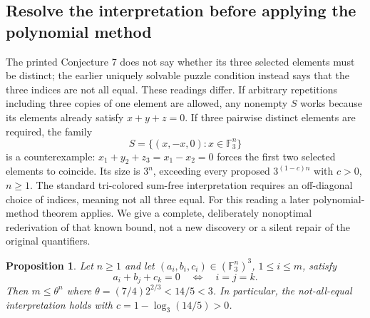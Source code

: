 \documentclass[11pt]{article}
\newtheorem{proposition}{Proposition}
\begin{document}
\subsection{Resolve the interpretation before applying the polynomial method}
The printed Conjecture 7 does not say whether its three selected elements must be distinct; the earlier uniquely solvable puzzle condition instead says that the three indices are not all equal. These readings differ. If arbitrary repetitions including three copies of one element are allowed, any nonempty $S$ works because its elements already satisfy $x+y+z=0$. If three pairwise distinct elements are required, the family
\[
S=\{(x,-x,0):x\in\mathbb F_3^n\}
\]
is a counterexample: $x_1+y_2+z_3=x_1-x_2=0$ forces the first two selected elements to coincide. Its size is $3^n$, exceeding every proposed $3^{(1-c)n}$ with $c>0$, $n\ge1$.
The standard tri-colored sum-free interpretation requires an off-diagonal choice of indices, meaning not all three equal. For this reading a later polynomial-method theorem applies. We give a complete, deliberately nonoptimal rederivation of that known bound, not a new discovery or a silent repair of the original quantifiers.
\begin{proposition}
Let $n\ge1$ and let $(a_i,b_i,c_i)\in(\mathbb F_3^n)^3$, $1\le i\le m$, satisfy
\[
a_i+b_j+c_k=0\quad\Longleftrightarrow\quad i=j=k.
\]
Then $m\le\theta^n$ where $\theta=(7/4)2^{2/3}<14/5<3$. In particular, the not-all-equal interpretation holds with $c=1-\log_3(14/5)>0$.
\end{proposition}
\end{document}
